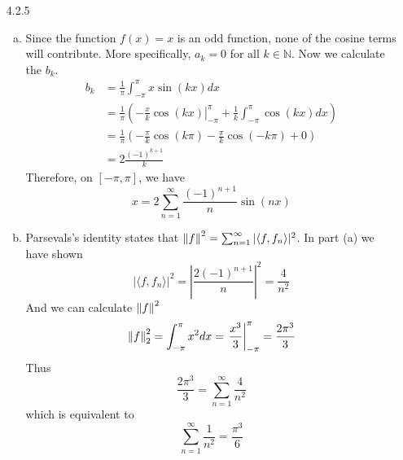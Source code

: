 \documentclass[../../Solutions.tex]{subfiles}
\begin{document}
\begin{itemize}
	\item [4.2.5]
	\begin{enumerate}[(a)]
		\item Since the function $f(x) = x$ is an odd function, none of the cosine terms will contribute.
			More specifically, $a_k = 0$ for all $k \in \mathbb{N}$.
			Now we calculate the $b_k$.
			\begin{equation*} \begin{split}
				b_k &= \frac{1}{\pi} \int_{-\pi}^{\pi} x\sin(kx) dx \\
					&= \frac{1}{\pi} \left(\left.-\frac{x}{k}\cos(kx)\right|_{-\pi}^{\pi} + \frac{1}{k}\int_{-\pi}^{\pi} \cos(kx) dx\right) \\
					&= \frac{1}{\pi}\left(-\frac{\pi}{k}\cos(k\pi)-\frac{\pi}{k}\cos(-k\pi)+0\right) \\
					&= 2\frac{(-1)^{k+1}}{k}
			\end{split} \end{equation*}
			Therefore, on $[-\pi,\pi]$, we have
			$$ x = 2\sum_{n=1}^\infty \frac{(-1)^{n+1}}{n}\sin(nx) $$
		\item Parsevals's identity states that $\left\lVert f\right\rVert^2 = \sum_{n=1}^\infty |\langle f,f_n \rangle|^2$.
			In part (a) we have shown
			$$ |\langle f,f_n \rangle|^2 = \left|\frac{2(-1)^{n+1}}{n}\right|^2 = \frac{4}{n^2} $$
			And we can calculate $\left\lVert f\right\rVert^2$
			$$ \left\lVert f\right\rVert^2_2 = \int_{-\pi}^{\pi} x^2 dx = \left.\frac{x^3}{3}\right|_{-\pi}^{\pi} = \frac{2\pi^3}{3} $$
			Thus
			$$ \frac{2\pi^3}{3} = \sum_{n=1}^\infty \frac{4}{n^2} $$
			which is equivalent to
			$$ \sum_{n=1}^\infty \frac{1}{n^2} = \frac{\pi^3}{6} $$
	\end{enumerate}

\end{itemize}
\end{document}
